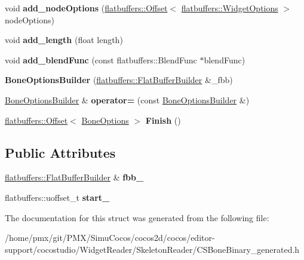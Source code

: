 \begin{DoxyCompactItemize}
void {\bfseries add\+\_\+node\+Options} (\hyperlink{structflatbuffers_1_1Offset}{flatbuffers\+::\+Offset}$<$ \hyperlink{structflatbuffers_1_1WidgetOptions}{flatbuffers\+::\+Widget\+Options} $>$ node\+Options)
\item 
\mbox{\label{structflatbuffers_1_1BoneOptionsBuilder_a854cf2871fd7b72f14304967bdf5179c}} 
void {\bfseries add\+\_\+length} (float length)
\item 
\mbox{\label{structflatbuffers_1_1BoneOptionsBuilder_aca118599b7357a52abf75478af4b3957}} 
void {\bfseries add\+\_\+blend\+Func} (const flatbuffers\+::\+Blend\+Func $\ast$blend\+Func)
\item 
\mbox{\label{structflatbuffers_1_1BoneOptionsBuilder_a063e2804fec2c5a8843c7ddbe7226d65}} 
{\bfseries Bone\+Options\+Builder} (\hyperlink{classflatbuffers_1_1FlatBufferBuilder}{flatbuffers\+::\+Flat\+Buffer\+Builder} \&\+\_\+fbb)
\item 
\mbox{\label{structflatbuffers_1_1BoneOptionsBuilder_a4220860642e64cd18e5690881213c612}} 
\hyperlink{structflatbuffers_1_1BoneOptionsBuilder}{Bone\+Options\+Builder} \& {\bfseries operator=} (const \hyperlink{structflatbuffers_1_1BoneOptionsBuilder}{Bone\+Options\+Builder} \&)
\item 
\mbox{\label{structflatbuffers_1_1BoneOptionsBuilder_a980c820bacd96cfeaaf3b337775de913}} 
\hyperlink{structflatbuffers_1_1Offset}{flatbuffers\+::\+Offset}$<$ \hyperlink{structflatbuffers_1_1BoneOptions}{Bone\+Options} $>$ {\bfseries Finish} ()
\end{DoxyCompactItemize}
\subsection*{Public Attributes}
\begin{DoxyCompactItemize}
\item 
\mbox{\label{structflatbuffers_1_1BoneOptionsBuilder_a41478f5c056c757dc92f1fc2fc7ca776}} 
\hyperlink{classflatbuffers_1_1FlatBufferBuilder}{flatbuffers\+::\+Flat\+Buffer\+Builder} \& {\bfseries fbb\+\_\+}
\item 
\mbox{\label{structflatbuffers_1_1BoneOptionsBuilder_ae587c7e649c0f81daa427bd85e0e73ef}} 
flatbuffers\+::uoffset\+\_\+t {\bfseries start\+\_\+}
\end{DoxyCompactItemize}


The documentation for this struct was generated from the following file\+:\begin{DoxyCompactItemize}
\item 
/home/pmx/git/\+P\+M\+X/\+Simu\+Cocos/cocos2d/cocos/editor-\/support/cocostudio/\+Widget\+Reader/\+Skeleton\+Reader/C\+S\+Bone\+Binary\+\_\+generated.\+h\end{DoxyCompactItemize}
